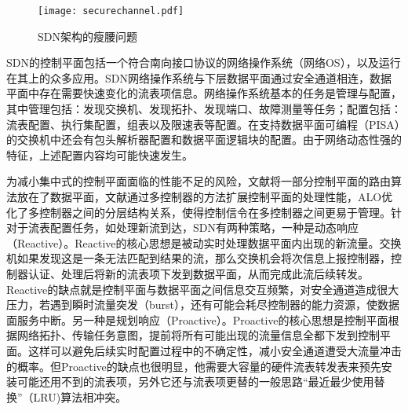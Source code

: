 \begin{figure}[!ht]
	\centering 
	\vspace{-1.5mm}
	\texttt{[image: securechannel.pdf]}
	\caption{SDN架构的瘦腰问题} \label{fig:securechannel}
\end{figure}

SDN的控制平面包括一个符合南向接口协议的网络操作系统（网络OS），以及运行在其上的众多应用。SDN网络操作系统与下层数据平面通过安全通道相连，数据平面中存在需要快速变化的流表项信息。网络操作系统基本的任务是管理与配置，其中管理包括：发现交换机、发现拓扑、发现端口、故障测量等任务；配置包括：流表配置、执行集配置，组表以及限速表等配置。在支持数据平面可编程（PISA）的交换机中还会有包头解析器配置和数据平面逻辑块的配置。由于网络动态性强的特征，上述配置内容均可能快速发生。

为减小集中式的控制平面面临的性能不足的风险，文献\cite{curtis2011devoflow,openflowhibd,yu2010scalable}将一部分控制平面的路由算法放在了数据平面，文献\cite{yazici2014controlling,openflow12}通过多控制器的方法扩展控制平面的处理性能，ALO\cite{alo2012}优化了多控制器之间的分层结构关系，使得控制信令在多控制器之间更易于管理。针对于流表配置任务，如处理新流到达，SDN有两种策略，一种是动态响应（Reactive）。Reactive的核心思想是被动实时处理数据平面内出现的新流量。交换机如果发现这是一条无法匹配到结果的流，那么交换机会将次信息上报控制器，控制器认证、处理后将新的流表项下发到数据平面，从而完成此流后续转发。Reactive的缺点就是控制平面与数据平面之间信息交互频繁，对安全通道造成很大压力，若遇到瞬时流量突发（burst），还有可能会耗尽控制器的能力资源，使数据面服务中断。另一种是规划响应（Proactive）。Proactive的核心思想是控制平面根据网络拓扑、传输任务意图，提前将所有可能出现的流量信息全都下发到控制平面。这样可以避免后续实时配置过程中的不确定性，减小安全通道遭受大流量冲击的概率。但Proactive的缺点也很明显，他需要大容量的硬件流表转发表来预先安装可能还用不到的流表项，另外它还与流表项更替的一般思路“最近最少使用替换”（LRU)算法相冲突。



